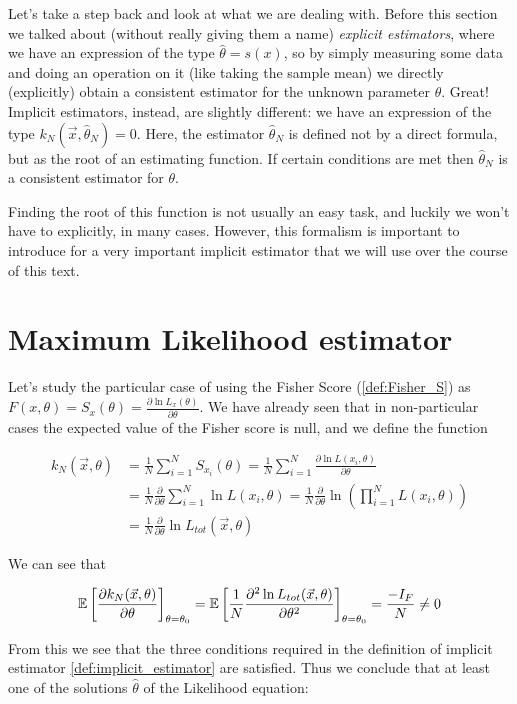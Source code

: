 Let's take a step back and look at what we are dealing with. Before this section we talked about (without really giving them a name) \emph{explicit estimators}, where we have an expression of the type $\hat\theta = s(x)$, so by simply measuring some data and doing an operation on it (like taking the sample mean) we directly (explicitly) obtain a consistent estimator for the unknown parameter $\theta$. Great! Implicit estimators, instead, are slightly different: we have an expression of the type $k_N(\vec{x}, \hat\theta_N) = 0$. Here, the estimator $\hat\theta_N$ is defined not by a direct formula, but as the root of an estimating function. If certain conditions are met then $\hat\theta_N$ is a consistent estimator for $\theta$.

Finding the root of this function is not usually an easy task, and luckily we won't have to explicitly, in many cases. However, this formalism is important to introduce for a very important implicit estimator that we will use over the course of this text.

\section{Maximum Likelihood estimator}

Let's study the particular case of using the Fisher Score (\ref{def:Fisher_S}) as $F(x,\theta) = S_x(\theta) = \frac{\partial \ln L_x(\theta)}{\partial\theta}$. We have already seen that in non-particular cases the expected value of the Fisher score is null, and we define the function 

	\begin{align*}
		k_N(\vec{x},\theta) &= \frac{1}{N}\sum_{i=1}^N S_{x_i}(\theta) = \frac{1}{N}\sum_{i=1}^N \frac{\partial\ln L(x_i,\theta)}{\partial\theta} \\
		&= \frac{1}{N}\frac{\partial}{\partial\theta}\sum_{i=1}^N \ln L(x_i,\theta)=\frac{1}{N}\frac{\partial}{\partial\theta}\ln \left(\prod_{i=1}^{N}L(x_i,\theta)\right) \\
		&= \frac{1}{N}\frac{\partial}{\partial\theta}\ln L_{tot}(\vec{x},\theta)
	\end{align*}


We can see that
	
	\[
	\mathbb{E}\left[\frac{\partial k_N(\vec{x},\theta)}{\partial\theta}\right]_{\theta=\theta_0} = \mathbb{E}\left[\frac{1}{N}\frac{\partial^2\ln L_{tot}(\vec{x},\theta)}{\partial\theta^2}\right]_{\theta=\theta_0}= \frac{-I_F}{N} \neq 0
	\]

From this we see that the three conditions required in the definition of implicit estimator \ref{def:implicit_estimator} are satisfied. Thus we conclude that at least one of the solutions $\hat\theta$ of the Likelihood equation:


